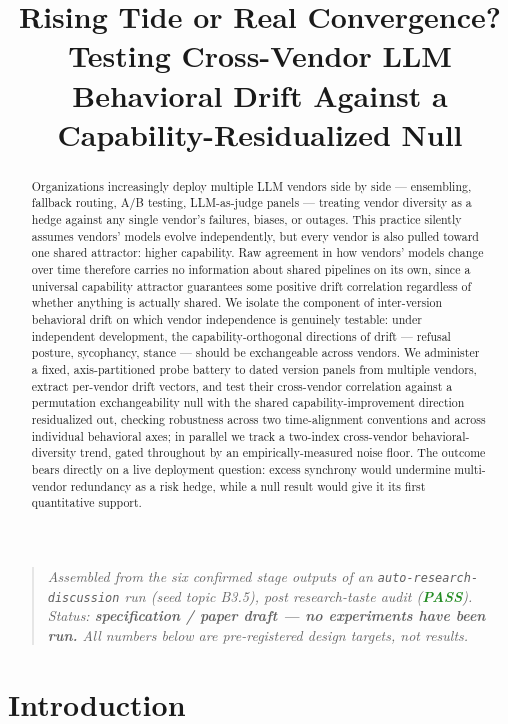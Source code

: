 \documentclass[11pt]{article}
\title{\textbf{Rising Tide or Real Convergence?\\ Testing Cross-Vendor LLM Behavioral Drift Against a Capability-Residualized Null}}
\author{}
\date{}
\begin{document}
\maketitle
\vspace{-2em}

\begin{quote}
\small\textit{Assembled from the six confirmed stage outputs of an \texttt{auto-research-discussion} run (seed topic B3.5), post research-taste audit (\textcolor{ForestGreen}{\textbf{PASS}}). Status: \textbf{specification / paper draft --- no experiments have been run.} All numbers below are pre-registered design targets, not results.}
\end{quote}

\begin{abstract}
Organizations increasingly deploy multiple LLM vendors side by side --- ensembling, fallback routing, A/B testing, LLM-as-judge panels --- treating vendor diversity as a hedge against any single vendor's failures, biases, or outages. This practice silently assumes vendors' models evolve independently, but every vendor is also pulled toward one shared attractor: higher capability. Raw agreement in how vendors' models change over time therefore carries no information about shared pipelines on its own, since a universal capability attractor guarantees some positive drift correlation regardless of whether anything is actually shared. We isolate the component of inter-version behavioral drift on which vendor independence is genuinely testable: under independent development, the capability-orthogonal directions of drift --- refusal posture, sycophancy, stance --- should be exchangeable across vendors. We administer a fixed, axis-partitioned probe battery to dated version panels from multiple vendors, extract per-vendor drift vectors, and test their cross-vendor correlation against a permutation exchangeability null with the shared capability-improvement direction residualized out, checking robustness across two time-alignment conventions and across individual behavioral axes; in parallel we track a two-index cross-vendor behavioral-diversity trend, gated throughout by an empirically-measured noise floor. The outcome bears directly on a live deployment question: excess synchrony would undermine multi-vendor redundancy as a risk hedge, while a null result would give it its first quantitative support.
\end{abstract}

\section{Introduction}
\end{document}
